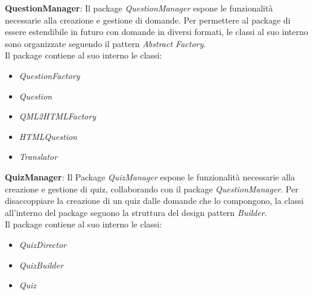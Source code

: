 \item \textbf{QuestionManager}:
	Il package \emph{QuestionManager} espone le funzionalità necessarie alla creazione e gestione di domande. Per permettere al package di essere estendibile in futuro con domande in diversi formati, le classi al suo interno sono organizzate seguendo il pattern \emph{Abstract Factory}. \\
	Il package contiene al suo interno le classi:
	\begin{itemize}
		\item \textit{QuestionFactory}
		\item \textit{Question}
		\item \textit{QML2HTMLFactory}
		\item \textit{HTMLQuestion}
		\item \textit{Translator}
	\end{itemize}
	
	\item\textbf{QuizManager}:
	Il Package \emph{QuizManager} espone le funzionalità necessarie alla creazione e gestione di quiz, collaborando con il package \emph{QuestionManager}. Per disaccoppiare la creazione di un quiz dalle domande che lo compongono, la classi all'interno del package seguono la struttura del design pattern \emph{Builder}.\\ 
	Il package contiene al suo interno le classi:
	\begin{itemize}
		\item \textit{QuizDirector}
		\item \textit{QuizBuilder}
		\item \textit{Quiz}
	\end{itemize}





